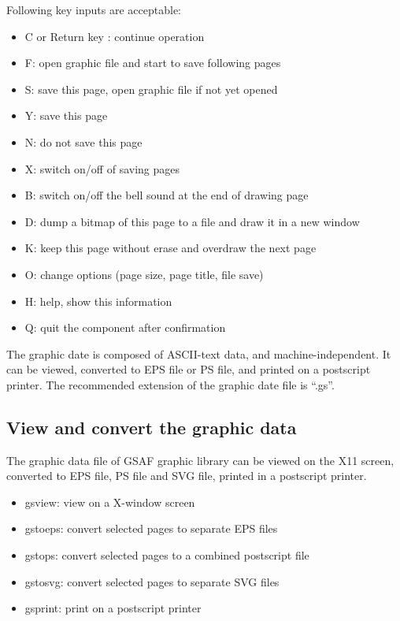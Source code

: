 \documentclass[11pt]{article}
\begin{document}
Following key inputs are acceptable:
\begin{itemize}
\item[] C or Return key : continue operation
\item[] F: open graphic file and start to save following pages
\item[] S: save this page, open graphic file if not yet opened
\item[] Y: save this page
\item[] N: do not save this page
\item[] X: switch on/off of saving pages\item[] B: switch on/off the bell sound at the end of drawing page
\item[] D: dump a bitmap of this page to a file and draw it in a new window
\item[] K: keep this page without erase and overdraw the next page
\item[] O: change options (page size, page title, file save)
\item[] H: help, show this information
\item[] Q: quit the component after confirmation
\end{itemize}

The graphic date is composed of ASCII-text data, and
machine-independent.  It can be viewed, converted to EPS file or PS
file, and printed on a postscript printer.  The recommended extension
of the graphic date file is ``.gs''.

\subsection{View and convert the graphic data}

The graphic data file of GSAF graphic library can be viewed on the X11
screen, converted to EPS file, PS file and SVG file, printed in a
postscript printer.

\begin{itemize}
\item[] gsview: view on a X-window screen
\item[] gstoeps: convert selected pages to separate EPS files
\item[] gstops: convert selected pages to a combined postscript file
\item[] gstosvg: convert selected pages to separate SVG files
\item[] gsprint: print on a postscript printer
\end{itemize}
\end{document}
